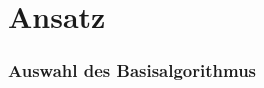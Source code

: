 
\chapter{Ansatz}
\label{sec:concepts}


\subsection{Auswahl des Basisalgorithmus}
\label{sec:AuswahlBA}





